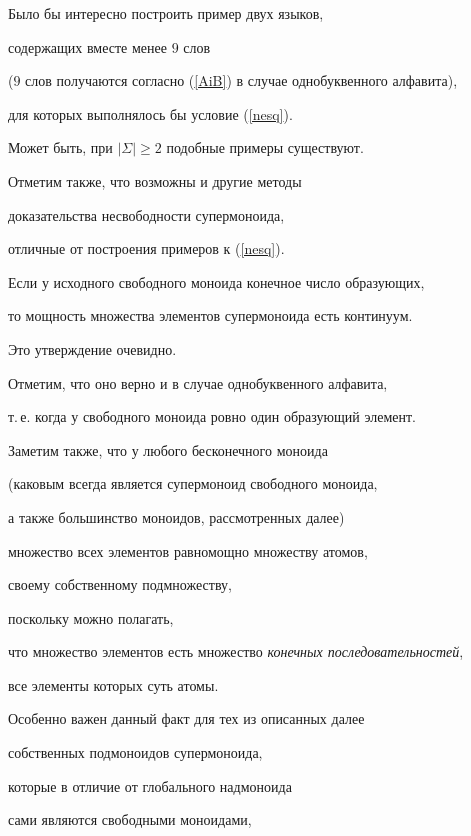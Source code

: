  Было бы интересно построить пример двух языков,


 содержащих вместе менее $9$ слов


 ($9$ слов получаются согласно (\ref{AiB}) в случае однобуквенного алфавита),


 для которых выполнялось бы условие (\ref{nesq}).


 Может быть, при $|\Sigma|\ge 2$ подобные примеры существуют.


 Отметим также, что возможны и другие методы


 доказательства несвободности супермоноида,


 отличные от построения примеров к (\ref{nesq}).





 \begin{props}


 Если у исходного свободного моноида конечное число образующих,


 то мощность множества элементов супермоноида есть континуум.


 \end{props}





 Это утверждение очевидно.


 Отметим, что оно верно и в случае однобуквенного алфавита,


 т.\,е. когда у свободного моноида ровно один образующий элемент.


 Заметим также, что у любого бесконечного моноида


 (каковым всегда является супермоноид свободного моноида,


 а также большинство моноидов, рассмотренных далее)


 множество всех элементов равномощно множеству атомов,


 своему собственному подмножеству, 


 поскольку можно полагать,


 что множество элементов есть множество {\it конечных последовательностей},


 все элементы которых суть атомы.


 Особенно важен данный факт для тех из описанных далее


 собственных подмоноидов супермоноида,


 которые в отличие от глобального надмоноида


 сами являются свободными моноидами,


